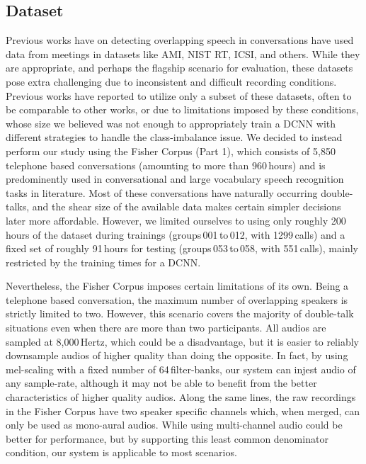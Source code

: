 \documentclass[a4paper]{article}
\begin{document}
\subsection{Dataset}
Previous works have on detecting overlapping speech in conversations have used data from meetings in datasets like AMI, NIST RT, ICSI, and others.  %
While they are appropriate, and perhaps the flagship scenario for evaluation,
these datasets pose extra challenging due to inconsistent and difficult recording conditions.
Previous works have reported to utilize only a subset of these datasets,
often to be comparable to other works,  %
or due to limitations imposed by these conditions,
whose size we believed was not enough to appropriately train a DCNN with different strategies to handle the class-imbalance issue.
We decided to instead perform our study using the Fisher Corpus (Part 1),  %
which consists of 5,850 telephone based conversations (amounting to more than 960\,hours) and is predominently used in conversational and large vocabulary speech recognition tasks in literature.  %
Most of these conversations have naturally occurring double-talks,
and the shear size of the available data makes certain simpler decisions later more affordable.
However, we limited ourselves to using only roughly 200\,hours of the dataset during trainings
(groups\,001\,to\,012, with 1299\,calls) and a fixed set of roughly 91\,hours for testing
(groups\,053\,to\,058, with 551\,calls),
mainly restricted by the training times for a DCNN.

Nevertheless, the Fisher Corpus imposes certain limitations of its own.
Being a telephone based conversation, the maximum number of overlapping speakers is strictly limited to two.
However, this scenario covers the majority of double-talk situations even when there are more than two participants.  %
All audios are sampled at 8,000\,Hertz, which could be a disadvantage,
but it is easier to reliably downsample audios of higher quality than doing the opposite.
In fact, by using mel-scaling with a fixed number of 64\,filter-banks,
our system can injest audio of any sample-rate,
although it may not be able to benefit from the better characteristics of higher quality audios.
Along the same lines, the raw recordings in the Fisher Corpus have two speaker specific channels which, when merged,
can only be used as mono-aural audios.
While using multi-channel audio could be better for performance,
but by supporting this least common denominator condition,
our system is applicable to most scenarios.
\end{document}
